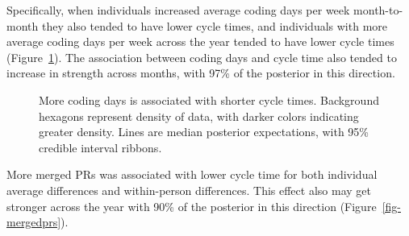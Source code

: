 \documentclass[
]{article}
\begin{document}
Specifically, when individuals increased average coding days per week
month-to-month they also tended to have lower cycle times, and
individuals with more average coding days per week across the year
tended to have lower cycle times (Figure~\ref{fig-codingdays}). The
association between coding days and cycle time also tended to increase
in strength across months, with 97\% of the posterior in this direction.

\begin{figure}[htbp]


\caption[More coding days is associated with shorter cycle
times]{\label{fig-codingdays}More coding days is associated with shorter
cycle times. Background hexagons represent density of data, with darker
colors indicating greater density. Lines are median posterior
expectations, with 95\% credible interval ribbons.}

\end{figure}%

More merged PRs was associated with lower cycle time for both individual
average differences and within-person differences. This effect also may
get stronger across the year with 90\% of the posterior in this
direction (Figure~\ref{fig-mergedprs}).
\end{document}
